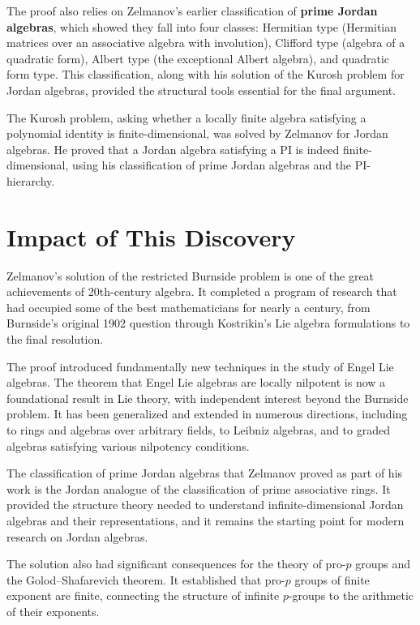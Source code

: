 The proof also relies on Zelmanov's earlier classification of
\textbf{prime Jordan algebras}, which showed they fall into four
classes: Hermitian type (Hermitian matrices over an associative
algebra with involution), Clifford type (algebra of a quadratic
form), Albert type (the exceptional Albert algebra), and quadratic
form type.  This classification, along with his solution of the
Kurosh problem for Jordan algebras, provided the structural tools
essential for the final argument.

The Kurosh problem, asking whether a locally finite algebra
satisfying a polynomial identity is finite-dimensional, was solved
by Zelmanov for Jordan algebras.  He proved that a Jordan algebra
satisfying a PI is indeed finite-dimensional, using his
classification of prime Jordan algebras and the PI-hierarchy.

\section{Impact of This Discovery}

Zelmanov's solution of the restricted Burnside problem \cite{zelmanov1992} is one of
the great achievements of 20th-century algebra.  It completed a
program of research that had occupied some of the best
mathematicians for nearly a century, from Burnside's original 1902
question through Kostrikin's Lie algebra formulations to the final
resolution.

The proof introduced fundamentally new techniques in the study of
Engel Lie algebras.  The theorem that Engel Lie algebras are
locally nilpotent is now a foundational result in Lie theory, with
independent interest beyond the Burnside problem.  It has been
generalized and extended in numerous directions, including to rings
and algebras over arbitrary fields, to Leibniz algebras, and to
graded algebras satisfying various nilpotency conditions.

The classification of prime Jordan algebras that Zelmanov proved as
part of his work is the Jordan analogue of the classification of
prime associative rings.  It provided the structure theory needed
to understand infinite-dimensional Jordan algebras and their
representations, and it remains the starting point for modern
research on Jordan algebras.

The solution also had significant consequences for the theory of
pro-$p$ groups and the Golod--Shafarevich theorem.  It established
that pro-$p$ groups of finite exponent are finite, connecting the
structure of infinite $p$-groups to the arithmetic of their
exponents.

